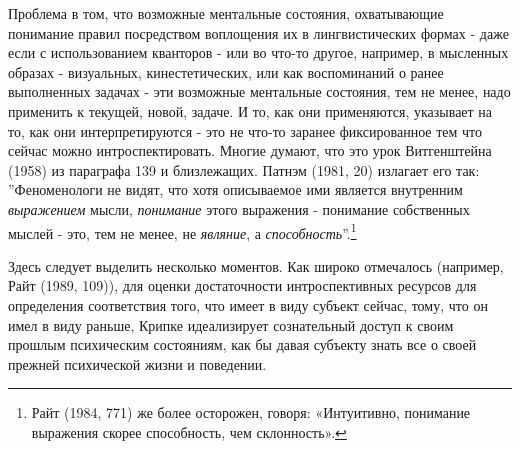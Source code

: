 \documentclass{book}
\begin{document}
Проблема в том, что возможные ментальные состояния, охватывающие понимание правил посредством воплощения их в лингвистических формах - даже если с использованием кванторов - или во что-то другое, например, в мысленных образах - визуальных, кинестетических, или как воспоминаний о ранее выполненных задачах - эти возможные ментальные состояния, тем не менее, надо применить к текущей, новой, задаче. И то, как они применяются, указывает на то, как они интерпретируются - это не что-то заранее фиксированное тем что сейчас можно интроспектировать. Многие думают, что это урок Витгенштейна (1958) из параграфа 139 и близлежащих. Патнэм (1981, 20) излагает его так: ''Феноменологи не видят, что хотя описываемое ими является внутренним \textit{выражением} мысли, \textit{понимание} этого выражения - понимание собственных мыслей - это, тем не менее, не \textit{являние}, а \textit{способность}''.\footnote{Райт (1984, 771) же более осторожен, говоря: «Интуитивно, понимание выражения скорее способность, чем склонность».}

Здесь следует выделить несколько моментов. Как широко отмечалось (например, Райт (1989, 109)), для оценки достаточности интроспективных ресурсов для определения соответствия того, что имеет в виду субъект сейчас, тому, что он имел в виду раньше, Крипке идеализирует сознательный доступ к своим прошлым психическим состояниям, как бы давая субъекту знать все о своей прежней психической жизни и поведении.
\end{document}
